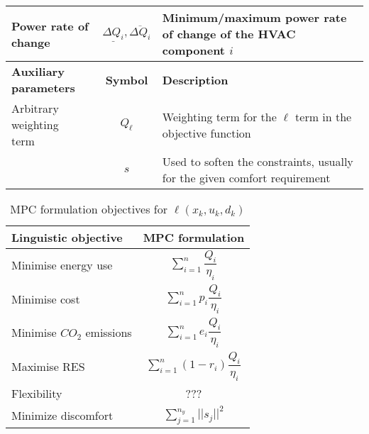 \documentclass[10pt]{extarticle}
\begin{document}
\begin{table}[h]
\begin{tabular}{l|c|l}
		Power rate of change & $\underline{\Delta Q_i},\overline{\Delta Q_i}$ & Minimum/maximum power rate of change of the HVAC component $i$ \\
		\midrule
		\textbf{Auxiliary parameters}  & \textbf{Symbol} &  \textbf{Description} \\
		\midrule
		\makecell[l]{Arbitrary weighting \\ term} & $Q_{\ell}$ &  Weighting term for the $\ell$ term in the objective function \\
		\makecell[l]{Slack variable} & $s$ &  Used to soften the constraints, usually for the given comfort requirement \\
		\bottomrule 
	\end{tabular}
\end{table}

\renewcommand{\arraystretch}{2.5}
\begin{table}[h]
	\centering
	\caption{MPC formulation objectives for $\ell(x_k, u_k, d_k)$}
	\label{tab:mpc_form:objectives}
	\begin{tabular}{l|c}
		\toprule
		\textbf{Linguistic objective}  & \textbf{MPC formulation} \\
		\midrule
		Minimise energy use &   $ \sum_{i=1}^{n} \dfrac{Q_{i}}{\eta_i}$ \\
		Minimise cost & $  \sum_{i=1}^{n} p_i \dfrac{Q_{i}}{\eta_i}$  \\
		Minimise $CO_2$ emissions & $ \sum_{i=1}^{n}  e_i \dfrac{Q_{i}}{\eta_i}$  \\
		Maximise RES &  $ \sum_{i=1}^{n} (1-r_i) \dfrac{Q_{i}}{\eta_i}$  \\
		Flexibility & ???  \\
		Minimize discomfort &  $ \sum_{j=1}^{n_y} ||s_j||^2$ \\
		\bottomrule 
	\end{tabular}
\end{table}
\end{document}
